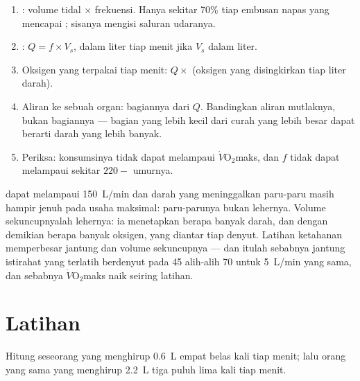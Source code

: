 \begin{method}\label{met:g10:heart-lungs-effort:compute}
\begin{enumerate}
  \item {}: volume tidal $\times$ frekuensi. Hanya sekitar 70\%
        tiap embusan napas yang mencapai ; sisanya mengisi
        saluran udaranya.
  \item {}: $Q = f \times V_s$, dalam liter tiap menit jika
        $V_s$ dalam liter.
  \item Oksigen yang terpakai tiap menit: $Q \times$ (oksigen yang
        disingkirkan tiap liter darah).
  \item Aliran ke sebuah organ: bagiannya dari $Q$. Bandingkan aliran
        mutlaknya, bukan bagiannya --- bagian yang lebih kecil dari
        curah yang lebih besar dapat berarti darah yang lebih banyak.
  \item Periksa: konsumsinya tidak dapat melampaui
        $\dot V\!\mathrm{O_2}$maks, dan $f$ tidak dapat melampaui
        sekitar $220 - $ umurnya.
\end{enumerate}
\end{method}

\begin{remark}\label{rem:g10:heart-lungs-effort:limit}
 dapat melampaui \qty{150}{L/min} dan darah yang meninggalkan
paru-paru masih hampir jenuh pada usaha maksimal: paru-parunya bukan
lehernya. Volume sekuncupnyalah lehernya: ia menetapkan berapa banyak
darah, dan dengan demikian berapa banyak oksigen, yang diantar tiap
denyut. Latihan ketahanan memperbesar jantung dan volume sekuncupnya
--- dan itulah sebabnya jantung istirahat yang terlatih berdenyut pada
45 alih-alih 70 untuk \qty{5}{L/min} yang sama, dan sebabnya
$\dot V\!\mathrm{O_2}$maks naik seiring latihan.
\end{remark}

\section{Latihan}

\begin{exercise}[$\star$]\label{exo:g10:heart-lungs-effort:1}
Hitung  seseorang yang menghirup \qty{0.6}{L} empat belas kali
tiap menit; lalu  orang yang sama yang menghirup \qty{2.2}{L}
tiga puluh lima kali tiap menit.
\end{exercise}

